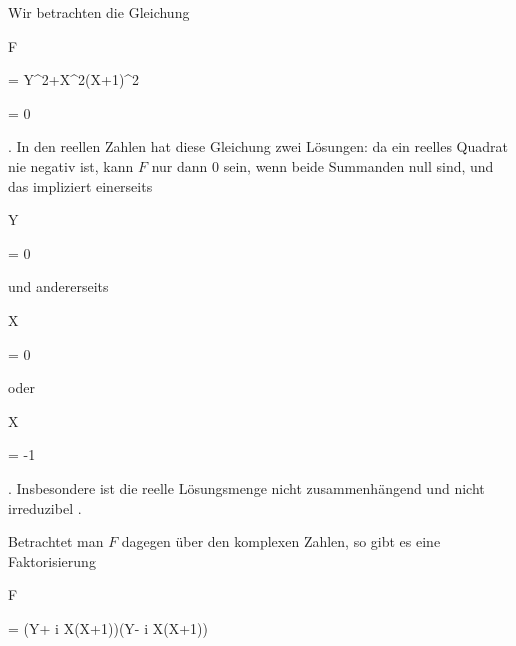 {


Wir betrachten die Gleichung


\mavergleichskettedisp


{\vergleichskette


{ F
}


{ =} { Y^2+X^2(X+1)^2
}


{ =} { 0
}


{ } {
}


{ } {
}


}
{}{}{.}
In den reellen Zahlen hat diese Gleichung zwei Lösungen: da ein reelles Quadrat nie negativ ist, kann $F$ nur dann $0$ sein, wenn beide Summanden null sind, und das impliziert einerseits


\mavergleichskette


{\vergleichskette


{ Y
}


{ = }{ 0
}


{  }{
}


{    }{
}


{   }{
}


}
{}{}{}
und andererseits


\mavergleichskette


{\vergleichskette


{ X
}


{ = }{ 0
}


{  }{
}


{    }{
}


{   }{
}


}
{}{}{}
oder


\mavergleichskette


{\vergleichskette


{ X
}


{ = }{ -1
}


{  }{
}


{    }{
}


{   }{
}


}
{}{}{.}
Insbesondere ist die reelle Lösungsmenge nicht zusammenhängend und nicht irreduzibel
 {} {.}


Betrachtet man $F$ dagegen über den komplexen Zahlen, so gibt es eine Faktorisierung


\mavergleichskettedisp


{\vergleichskette


{F
}


{ =} { (Y+ { \mathrm i} X(X+1))(Y- { \mathrm i} X(X+1))
}


}}
